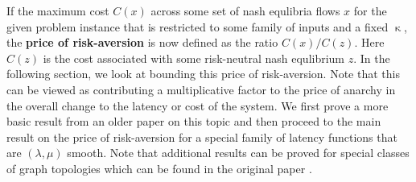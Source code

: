 If the maximum cost $C(x)$  across some set of nash equlibria flows $x$ for the given problem instance 
that is restricted to some family of inputs and a fixed $\upkappa$, the {\textbf{price of risk-aversion}} is now defined as the
ratio $C(x)/C(z)$. Here $C(z)$ is the cost associated with some risk-neutral nash equlibrium $z$. 
In the following section, we look at bounding this price of risk-aversion. Note that this can be viewed as contributing a 
multiplicative factor to the price of anarchy in the overall change to the latency or cost of the system. We first prove a 
more basic result from an older paper on this topic \cite{risk-averse-background} and then proceed to the main result on the price
of risk-aversion for 
a special family of latency functions that are $(\lambda, \mu)$ smooth. Note that additional results can be proved for special classes
of graph topologies which can be found in the original paper \cite{risk-averse}.




